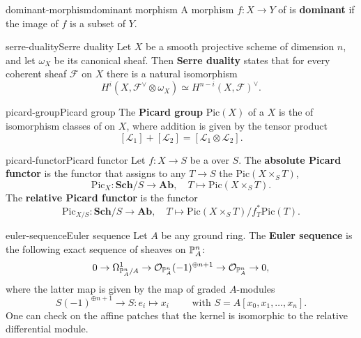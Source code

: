 \begin{topic}{dominant-morphism}{dominant morphism}
    A morphism $f : X \to Y$ of  is \textbf{dominant} if the image of $f$ is a  subset of $Y$.
\end{topic}

\begin{topic}{serre-duality}{Serre duality}
    Let $X$ be a smooth projective scheme of dimension $n$, and let $\omega_X$ be its canonical sheaf. Then \textbf{Serre duality} states that for every coherent sheaf $\mathcal{F}$ on $X$ there is a natural isomorphism
    \[ H^i(X, \mathcal{F}^\vee \otimes \omega_X) \simeq H^{n - i}(X, \mathcal{F})^\vee . \]
\end{topic}

\begin{topic}{picard-group}{Picard group}
    The \textbf{Picard group} $\text{Pic}(X)$ of a  $X$ is the  of isomorphism classes of  on $X$, where addition is given by the tensor product
    \[ [\mathcal{L}_1] + [\mathcal{L}_2] = [\mathcal{L}_1 \otimes \mathcal{L}_2] . \]
\end{topic}

\begin{topic}{picard-functor}{Picard functor}
    Let $f : X \to S$ be a  over $S$. The \textbf{absolute Picard functor} is the functor that assigns to any $T \to S$ the  $\text{Pic}(X \times_S T)$,
    \[ \text{Pic}_X : \textbf{Sch}/S \to \textbf{Ab}, \quad T \mapsto \text{Pic}(X \times_S T) . \]
    The \textbf{relative Picard functor} is the functor
    \[ \text{Pic}_{X/S} : \textbf{Sch}/S \to \textbf{Ab}, \quad T \mapsto \text{Pic}(X \times_S T) / f_T^* \text{Pic}(T) . \]
\end{topic}

\begin{topic}{euler-sequence}{Euler sequence}
    Let $A$ be any ground ring. The \textbf{Euler sequence} is the following exact sequence of sheaves on $\mathbb{P}_A^n$:
    \[ 0 \rightarrow \Omega^1_{\mathbb{P}^n_A/A} \rightarrow \mathcal{O}_{\mathbb{P}_A^n}(-1)^{\oplus n + 1} \rightarrow \mathcal{O}_{\mathbb{P}_A^n} \rightarrow 0 , \]
    where the latter map is given by the map of graded $A$-modules
    \[ S(-1)^{\oplus n + 1} \to S : e_i \mapsto x_i \qquad \text{ with } S = A[x_0, x_1, \ldots, x_n] . \]
    One can check on the affine patches that the kernel is isomorphic to the relative differential module.
\end{topic}

